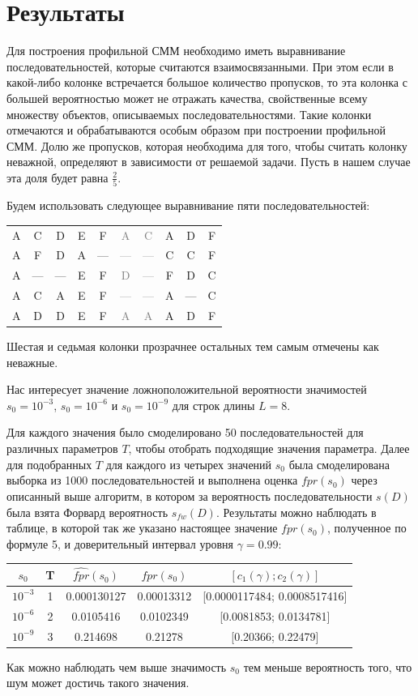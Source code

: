 \documentclass[]{article}
\begin{document}
			\section{Результаты}						
			Для построения профильной СММ необходимо иметь выравнивание последовательностей, которые считаются взаимосвязанными. При этом если в какой-либо колонке встречается большое количество пропусков, то эта колонка с большей вероятностью может не отражать качества, свойственные всему множеству объектов, описываемых последовательностями. Такие колонки отмечаются и обрабатываются особым образом при построении профильной СММ. Долю же пропусков, которая необходима для того, чтобы считать колонку неважной, определяют в зависимости от решаемой задачи. Пусть в нашем случае эта доля будет равна $\frac{2}{5}$.
			
			Будем использовать следующее выравнивание пяти последовательностей:
			\begin{center}
				\begin{tabular}{cccccccccc}
					A&C&D&E&F&\textcolor{gray}{A}&\textcolor{gray}{C}&A&D&F\\
					A&F&D&A&—&\textcolor{gray}{—}&\textcolor{gray}{—}&C&C&F\\
					A&—&—&E&F&\textcolor{gray}{D}&\textcolor{gray}{—}&F&D&C\\
					A&C&A&E&F&\textcolor{gray}{—}&\textcolor{gray}{—}&A&—&C\\
					A&D&D&E&F&\textcolor{gray}{A}&\textcolor{gray}{A}&A&D&F
				\end{tabular}
			\end{center}
			Шестая и седьмая колонки прозрачнее остальных тем самым отмечены как неважные.
			
			Нас интересует значение ложноположительной вероятности значимостей $s_{0}=10^{-3}$, $s_{0}=10^{-6}$ и $s_{0}=10^{-9}$ для строк длины $L=8$.
			
			Для каждого значения было смоделировано 50 последовательностей для различных параметров $T$, чтобы отобрать подходящие значения параметра. Далее для подобранных $T$ для каждого из четырех значений $s_{0}$ была смоделирована выборка из 1000 последовательностей и выполнена оценка $\widehat{fpr}(s_{0})$ через описанный выше алгоритм, в котором за вероятность последовательности $s(D)$ была взята Форвард вероятность $s_{fw}(D)$. Результаты можно наблюдать в таблице, в которой так же указано настоящее значение $fpr(s_0)$, полученное по формуле 5, и доверительный интервал уровня $\gamma = 0.99$:
			\begin{center}
				\begin{tabular}{ccccc}
					$s_{0}$&T&$\widehat{fpr}(s_{0})$&$fpr(s_{0})$&$[c_{1}(\gamma);c_{2}(\gamma)]$  \\ \hline
					$10^{-3}$&1&0.000130127&0.00013312&[0.0000117484; 0.0008517416] \\
					$10^{-6}$&2&0.0105416&0.0102349&[0.0081853; 0.0134781] \\
					$10^{-9}$&3&0.214698&0.21278&[0.20366; 0.22479] \\					
				\end{tabular}
			\end{center}			
			Как можно наблюдать чем выше значимость $s_{0}$ тем меньше вероятность того, что шум может достичь такого значения.
			
\end{document}
